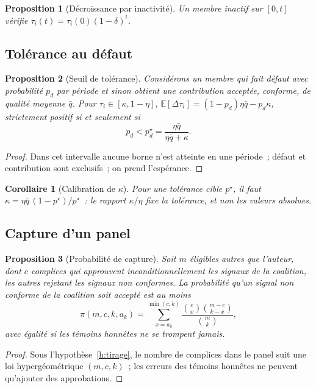 \documentclass[11pt,a4paper]{article}
\theoremstyle{plain}
\newtheorem{proposition}{Proposition}
\newtheorem{corollaire}{Corollaire}
\theoremstyle{definition}
\theoremstyle{remark}
\newcommand{\1}{\mathbf{1}}
\newcommand{\E}{\mathbb{E}}
\begin{document}
\begin{proposition}[Décroissance par inactivité]
Un membre inactif sur $[0,t]$ vérifie $\tau_i(t)=\tau_i(0)(1-\delta)^t$.
\end{proposition}

\subsection{Tolérance au défaut}

\begin{proposition}[Seuil de tolérance]\label{prop:defaut}
Considérons un membre qui fait défaut avec probabilité $p_d$ par période et
sinon obtient une contribution acceptée, conforme, de qualité moyenne $\bar q$.
Pour $\tau_i\in[\kappa,1-\eta]$, $\E[\Delta\tau_i]=(1-p_d)\eta\bar q-p_d\kappa$,
strictement positif si et seulement si
\begin{equation}
p_d<p^\star_d=\frac{\eta\bar q}{\eta\bar q+\kappa}.
\label{eq:pstar}
\end{equation}
\end{proposition}
\begin{proof}
Dans cet intervalle aucune borne n'est atteinte en une période~; défaut et
contribution sont exclusifs~; on prend l'espérance.
\end{proof}

\begin{corollaire}[Calibration de $\kappa$]\label{cor:kappa}
Pour une tolérance cible $p^\star$, il faut
$\kappa=\eta\bar q\,(1-p^\star)/p^\star$~: le rapport $\kappa/\eta$ fixe la
tolérance, et non les valeurs absolues.
\end{corollaire}

\subsection{Capture d'un panel}

\begin{proposition}[Probabilité de capture]\label{prop:capture}
Soit $m$ éligibles autres que l'auteur, dont $c$ complices qui approuvent
inconditionnellement les signaux de la coalition, les autres rejetant les
signaux non conformes. La probabilité qu'un signal non conforme de la coalition
soit accepté est au moins
\begin{equation}
\pi(m,c,k,a_k)=\sum_{x=a_k}^{\min(c,k)}
\frac{\binom{c}{x}\binom{m-c}{k-x}}{\binom{m}{k}},
\label{eq:hyper}
\end{equation}
avec égalité si les témoins honnêtes ne se trompent jamais.
\end{proposition}
\begin{proof}
Sous l'hypothèse~\ref{h:tirage}, le nombre de complices dans le panel suit une
loi hypergéométrique $(m,c,k)$~; les erreurs des témoins honnêtes ne peuvent
qu'ajouter des approbations.
\end{proof}
\end{document}
